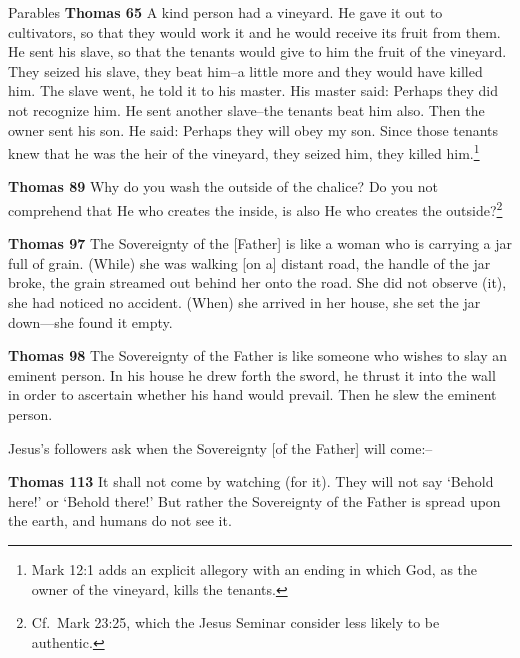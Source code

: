 \documentclass[10pt,twoside]{book}
\newcommand{\quotesize}{\normalsize{}}
\newcommand{\comm}[1]{\begingroup \color{black!50} #1\endgroup}
\newenvironment{quotetext}{\begingroup\quotesize}{\endgroup}
\newcommand{\bible}[2]{\begin{quotetext}\textbf{#1} #2\end{quotetext}}
\newcommand{\thomas}[2]{\bible{Thomas #1}{#2}}
\begin{document}
\begin{section}{Parables}
\thomas{65}{
A kind person had a vineyard. He gave it out to cultivators, so that they would work it and he would receive its fruit from them. He sent his slave, so that the tenants would give to him the fruit of the vineyard. They seized his slave, they beat him--a little more and they would have killed him. The slave went, he told it to his master. His master said: Perhaps they did not recognize him. He sent another slave--the tenants beat him also. Then the owner sent his son. He said: Perhaps they will obey my son. Since those tenants knew that he was the heir of the vineyard, they seized him, they killed him.\footnote{Mark 12:1 adds an explicit allegory with an ending in which God, as the owner of the vineyard, kills the tenants.}
}

\thomas{89}{
Why do you wash the outside of the chalice? Do you not comprehend that He who creates the inside, is also He who creates the outside?\footnote{Cf.~Mark
23:25, which the Jesus Seminar consider less likely to be authentic.}
}

\thomas{97}{
The Sovereignty of the [Father] is like a woman who is carrying a jar full of grain. (While) she was walking [on a] distant road, the handle of the jar broke, the grain streamed out behind her onto the road. She did not observe (it), she had noticed no accident. (When) she arrived in her house, she set the jar down—she found it empty.
}

\thomas{98}{
The Sovereignty of the Father is like someone who wishes to slay an eminent person. In his house he drew forth the sword, he thrust it into the wall in order to ascertain whether his hand would prevail. Then he slew the eminent person.
}

\comm{Jesus's followers ask when the Sovereignty [of the Father] will come:--}

\thomas{113}{
It shall not come by watching (for it). They will not say `Behold here!' or `Behold there!' But rather the Sovereignty of the Father is spread upon the earth, and humans do not see it.
}

\end{section}
\end{document}
